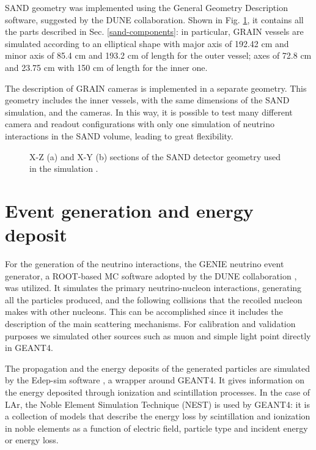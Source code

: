 SAND geometry was implemented using the General Geometry Description software, suggested by the DUNE collaboration.  Shown in Fig. \ref{fig:sand-sim}, it contains all the parts described in Sec. \ref{sand-components}: in particular, GRAIN vessels are simulated according to an elliptical shape with major axis of 192.42 cm and minor axis of 85.4 cm and 193.2 cm of length for the outer vessel; axes of 72.8 cm and 23.75 cm with 150 cm of length for the inner one. 

The description of GRAIN cameras is implemented in a separate geometry. This geometry includes the inner vessels, with the same dimensions of the SAND simulation, and the cameras. In this way, it is possible to test many different camera and readout configurations with only one simulation of neutrino interactions in the SAND volume, leading to great flexibility.

\begin{figure}[h!]
    \centering
    \caption{X-Z (a) and X-Y (b) sections of the SAND detector geometry used in the simulation \cite{tesi-cicero}.}
    \label{fig:sand-sim}
\end{figure}

\section{Event generation and energy deposit}
For the generation of the neutrino interactions, the GENIE neutrino event generator, a ROOT-based MC software adopted by the DUNE collaboration \cite{GENIE}, was utilized. It simulates the primary neutrino-nucleon interactions, generating all the particles produced, and the following collisions that the recoiled nucleon makes with other nucleons. This can be accomplished since it includes the description of the main scattering mechanisms. For calibration and validation purposes we simulated other sources such as muon and simple light point directly in GEANT4. 

The propagation and the energy deposits of the generated particles are simulated by the Edep-sim software \cite{Edep-sim}, a wrapper around GEANT4. It gives information on the energy deposited through ionization and scintillation processes. In the case of LAr, the Noble Element Simulation Technique (NEST) \cite{NEST} is used by GEANT4: it is a collection of models that describe the energy loss by scintillation and ionization in noble elements as a function of electric field, particle type and incident energy or energy loss.

